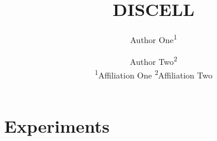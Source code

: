 \documentclass[letterpaper,10pt,twocolumn]{article}
\title{DISCELL%
}
\author{Author One\textsuperscript{1} \and Author Two\textsuperscript{2}\\[2pt]
  {\small \textsuperscript{1}Affiliation One \quad \textsuperscript{2}Affiliation Two}}
\date{}
\makeatletter
\newcommand{\markmainend}{\protected@write\@auxout{}{\string\gdef\string\mainpages{\thepage}}}
\makeatother
\begin{document}
\onecolumn
{}   %
\maketitle
\thispagestyle{empty}
\begin{abstract}
  
\end{abstract}
\clearpage
\twocolumn
{}  %




\section{Experiments}
\label{sec:experiments}










\markmainend


\end{document}
